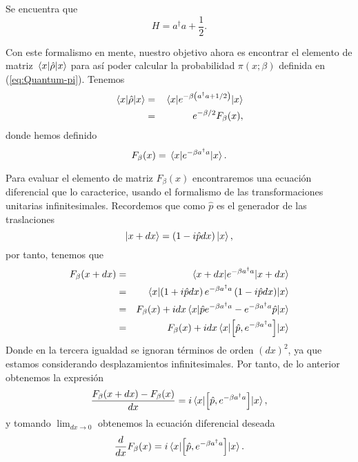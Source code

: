 \documentclass[%
 reprint,
 amsmath,amssymb,
 aps,
 pra,
]{revtex4-2}
\begin{document}
Se encuentra que 
\begin{equation}
H = a^\dag a+\frac{1}{2}.
\end{equation}

Con este formalismo en mente, nuestro objetivo ahora es encontrar el elemento de matriz $\ev{\hat{\rho}}{x}$ para así poder calcular la probabilidad $\pi(x;\beta)$ definida en (\ref{eq:Quantum-pi}). Tenemos
\begin{eqnarray}
\ev{\hat{\rho}}{x}	&=& \ev{e^{-\beta\left(a^\dag a + 1/2\right)}}{x} \nonumber \\
					&=& e^{-\beta/2}F_\beta(x) \label{eq:rho_x_x},
\end{eqnarray}
donde hemos definido
\begin{equation}
F_\beta(x) = \ev{e^{-\beta a^\dag a}}{x}.
\end{equation}

Para evaluar el elemento de matriz $F_\beta(x)$ encontraremos una ecuación diferencial que lo caracterice, usando el formalismo de las transformaciones unitarias infinitesimales. Recordemos que como $\hat{p}$ es el generador de las traslaciones
\begin{equation}
\ket{x+dx} = \left( 1 - i \hat{p} dx \right)\ket{x},
\end{equation}
por tanto, tenemos que
\begin{eqnarray}
F_\beta(x+dx) 	&=& \ev{e^{-\beta a^\dag a}}{x+dx} \nonumber \\ 
				&=& \ev{\left( 1 + i \hat{p} dx \right)e^{-\beta a^\dag a}\left( 1 - i \hat{p} dx \right)}{x} \nonumber \\
				&=& F_\beta(x)+idx\ev{\hat{p}e^{-\beta a^\dag a} - e^{-\beta a^\dag a}\hat{p}}{x} \nonumber \\
				&=& F_\beta(x)+idx\ev{\left[\hat{p},e^{-\beta a^\dag a}\right]}{x}
\end{eqnarray}
Donde en la tercera igualdad se ignoran términos de orden $(dx)^2$, ya que estamos considerando desplazamientos infinitesimales. Por tanto, de lo anterior obtenemos la expresión
\begin{equation}
\frac{F_\beta(x+dx)-F_\beta(x)}{dx} = i\ev{\left[\hat{p},e^{-\beta a^\dag a}\right]}{x},
\end{equation}
y tomando $\lim_{dx\rightarrow0}$ obtenemos la ecuación diferencial deseada
\begin{equation} 
\frac{d}{dx}F_\beta(x) = i\ev{\left[\hat{p},e^{-\beta a^\dag a}\right]}{x}. \label{eq:Diff-Eqn-F(x)}
\end{equation}
\end{document}
